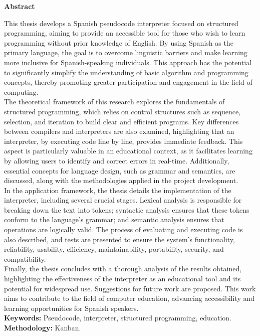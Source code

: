 \begin{spacing}{1.5}
  \begin{center}
    \Large \textbf{Abstract}
  \end{center}
  This thesis develops a Spanish pseudocode interpreter focused on structured programming, aiming to provide an accessible tool for those who wish to learn programming without prior knowledge of English. By using Spanish as the primary language, the goal is to overcome linguistic barriers and make learning more inclusive for Spanish-speaking individuals. This approach has the potential to significantly simplify the understanding of basic algorithm and programming concepts, thereby promoting greater participation and engagement in the field of computing. \\
  The theoretical framework of this research explores the fundamentals of structured programming, which relies on control structures such as sequence, selection, and iteration to build clear and efficient programs. Key differences between compilers and interpreters are also examined, highlighting that an interpreter, by executing code line by line, provides immediate feedback. This aspect is particularly valuable in an educational context, as it facilitates learning by allowing users to identify and correct errors in real-time. Additionally, essential concepts for language design, such as grammar and semantics, are discussed, along with the methodologies applied in the project development. \\
  In the application framework, the thesis details the implementation of the interpreter, including several crucial stages. Lexical analysis is responsible for breaking down the text into tokens; syntactic analysis ensures that these tokens conform to the language's grammar; and semantic analysis ensures that operations are logically valid. The process of evaluating and executing code is also described, and tests are presented to ensure the system's functionality, reliability, usability, efficiency, maintainability, portability, security, and compatibility. \\
  Finally, the thesis concludes with a thorough analysis of the results obtained, highlighting the effectiveness of the interpreter as an educational tool and its potential for widespread use. Suggestions for future work are proposed. This work aims to contribute to the field of computer education, advancing accessibility and learning opportunities for Spanish speakers. \\
  \textbf{Keywords:} Pseudocode, interpreter, structured programming, education. \\
  \textbf{Methodology:} Kanban.
\end{spacing}